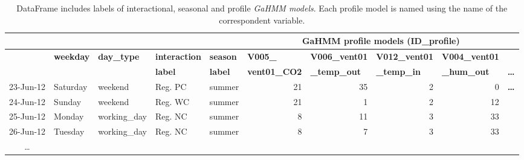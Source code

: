 \begin{table}[htbp]
  \centering
  \tiny
  \caption{DataFrame includes labels of interactional, seasonal and profile \textit{GaHMM models}. Each profile model is named using the name of the correspondent variable.}
    \begin{tabular}{|c|r|r|r|r|r|r|r|r|r|}
\cline{6-10}    \multicolumn{1}{r}{} & \multicolumn{1}{r}{} & \multicolumn{1}{r}{} & \multicolumn{1}{r}{} &      & \multicolumn{5}{c|}{GaHMM profile models (ID\_profile)} \bigstrut\\
    \hline
    \rowcolor[rgb]{ 1,  .753,  0} \multicolumn{1}{|l|}{\textbf{timestamp }} & \multicolumn{1}{l|}{\textbf{weekday}} & \multicolumn{1}{l|}{\textbf{day\_type }} & \multicolumn{1}{l|}{\textbf{interaction}} & \multicolumn{1}{l|}{\textbf{season }} & \multicolumn{1}{l|}{\textbf{V005\_}} & \multicolumn{1}{l|}{\textbf{V006\_vent01}} & \multicolumn{1}{l|}{\textbf{V012\_vent01}} & \multicolumn{1}{l|}{\textbf{V004\_vent01}} &  \bigstrut[t]\\
    \rowcolor[rgb]{ 1,  .753,  0}      &      &      & \multicolumn{1}{l|}{\textbf{label}} & \multicolumn{1}{l|}{\textbf{label}} & \multicolumn{1}{l|}{\textbf{vent01\_CO2 }} & \multicolumn{1}{l|}{\textbf{\_temp\_out }} & \multicolumn{1}{l|}{\textbf{\_temp\_in }} & \multicolumn{1}{l|}{\textbf{\_hum\_out }} & \multicolumn{1}{l|}{\textbf{…}} \bigstrut[b]\\
    \hline
    \multicolumn{1}{|r|}{23-Jun-12} & \multicolumn{1}{l|}{Saturday } & \multicolumn{1}{l|}{weekend } & \multicolumn{1}{l|}{Reg. PC } & \multicolumn{1}{l|}{summer } & 21   & 35   & 2    & 0    & \multicolumn{1}{l|}{\textbf{…}} \bigstrut\\
    \hline
    \multicolumn{1}{|r|}{24-Jun-12} & \multicolumn{1}{l|}{Sunday } & \multicolumn{1}{l|}{weekend } & \multicolumn{1}{l|}{Reg. WC } & \multicolumn{1}{l|}{summer } & 21   & 1    & 2    & 12   &  \bigstrut\\
    \hline
    \multicolumn{1}{|r|}{25-Jun-12} & \multicolumn{1}{l|}{Monday } & \multicolumn{1}{l|}{working\_day } & \multicolumn{1}{l|}{Reg. NC } & \multicolumn{1}{l|}{summer } & 8    & 11   & 3    & 33   &  \bigstrut\\
    \hline
    \multicolumn{1}{|r|}{26-Jun-12} & \multicolumn{1}{l|}{Tuesday } & \multicolumn{1}{l|}{working\_day } & \multicolumn{1}{l|}{Reg. NC } & \multicolumn{1}{l|}{summer } & 8    & 7    & 3    & 33   &  \bigstrut\\
    \hline
    …    &      &      &      &      &      &      &      &      &  \bigstrut\\
    \hline
    \end{tabular}%
  \label{tab:data_frame}%
\end{table}%


